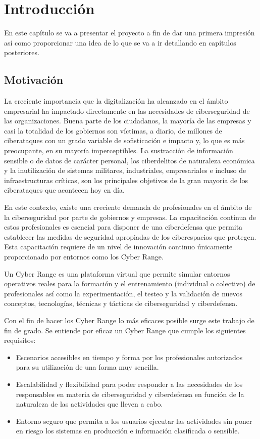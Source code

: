 \newpage
\setcounter{page}{1}
\chapter{Introducción}  
  En este capítulo se va a presentar el proyecto a fin de dar una primera impresión así como proporcionar una idea de lo que se va a ir detallando en capítulos posteriores.

\section{Motivación} \label{sec:mot}
  La creciente importancia que la digitalización ha alcanzado en el ámbito empresarial ha impactado directamente en las necesidades de ciberseguridad de las organizaciones. Buena parte de los ciudadanos, la mayoría de las empresas y casi la totalidad de los gobiernos son víctimas, a diario, de millones de ciberataques con un grado variable de sofisticación e impacto y, lo que es más preocupante, en su mayoría imperceptibles. La sustracción de información sensible o de datos de carácter personal, los ciberdelitos de naturaleza económica y la inutilización de sistemas militares, industriales, empresariales e incluso de infraestructuras críticas, son los principales objetivos de la gran mayoría de los ciberataques que acontecen hoy en día.

  En este contexto, existe una creciente demanda de profesionales en el ámbito de la ciberseguridad por parte de gobiernos y empresas. La capacitación continua de estos profesionales es esencial para disponer de una ciberdefensa que permita establecer las medidas de seguridad apropiadas de los ciberespacios que protegen. Esta capacitación  requiere de un nivel de innovación continuo únicamente proporcionado por entornos como los Cyber Range.

  Un Cyber Range es una plataforma virtual que permite simular entornos operativos reales para la formación y el entrenamiento (individual o colectivo) de profesionales así como la experimentación,  el testeo y  la validación de nuevos conceptos, tecnologías, técnicas y tácticas de ciberseguridad y ciberdefensa.

  Con el fin de hacer los Cyber Range lo más eficaces posible surge este trabajo de fin de grado. Se entiende por eficaz un Cyber Range que cumple los siguientes requisitos:
  \begin{itemize}
    \item Escenarios accesibles en tiempo y forma por los profesionales autorizados para su utilización de una forma muy sencilla.
    \item Escalabilidad y flexibilidad para poder responder a las necesidades de los responsables en materia de ciberseguridad y ciberdefensa en función de la naturaleza de las actividades que lleven a cabo.
    \item Entorno seguro que permita a los usuarios ejecutar las actividades sin poner en riesgo los sistemas en producción e información clasificada o sensible.
  \end{itemize}

